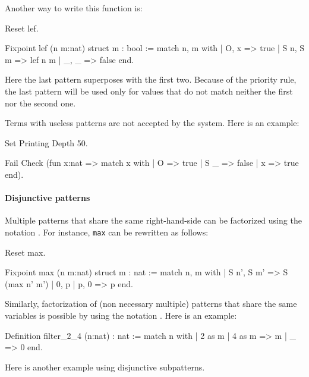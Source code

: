 Another way to write  this function is:

\begin{coq_eval}
Reset lef.
\end{coq_eval}
\begin{coq_example}
Fixpoint lef (n m:nat) {struct m} : bool :=
  match n, m with
  | O, x => true
  | S n, S m => lef n m
  | _, _ => false
  end.
\end{coq_example}

Here the last pattern superposes with the first two. Because
of the priority rule, the last pattern
will be used only for values that do not match neither the  first nor
the second one.

Terms with useless patterns are not accepted by the
system. Here is an example:
\begin{coq_eval}
Set Printing Depth 50.
\end{coq_eval}
\begin{coq_example}
Fail Check (fun x:nat =>
         match x with
         | O => true
         | S _ => false
         | x => true
         end).
\end{coq_example}

\paragraph{Disjunctive patterns}

Multiple patterns that share the same right-hand-side can be
factorized using the notation \nelist{\multpattern}{\tt |}. For instance,
{\tt max} can be rewritten as follows:

\begin{coq_eval}
Reset max.
\end{coq_eval}
\begin{coq_example}
Fixpoint max (n m:nat) {struct m} : nat :=
  match n, m with
  | S n', S m' => S (max n' m')
  | 0, p | p, 0 => p
  end.
\end{coq_example}

Similarly, factorization of (non necessary multiple) patterns
that share the same variables is possible by using the notation
\nelist{\pattern}{\tt |}. Here is an example:

\begin{coq_example}
Definition filter_2_4 (n:nat) : nat :=
  match n with
  | 2 as m | 4 as m => m
  | _ => 0
  end.
\end{coq_example}

Here is another example using disjunctive subpatterns.

